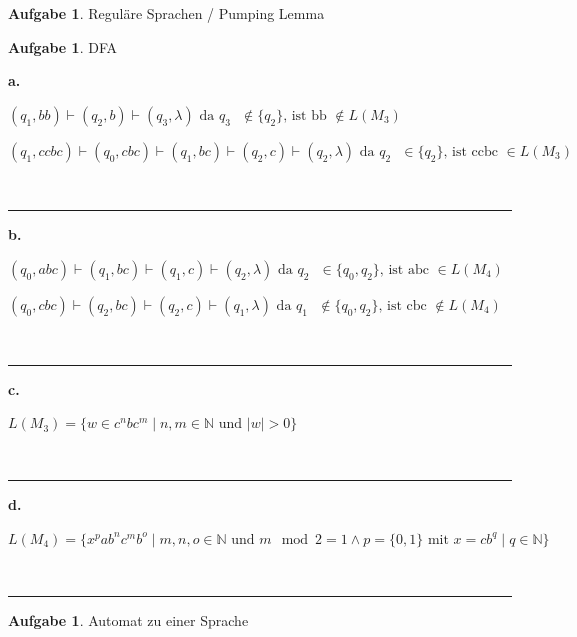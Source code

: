 \documentclass[10pt,leqno ]{article}
\theoremstyle{definition}
\newtheorem{problem}[theorem]{Aufgabe}
\newenvironment{solution}[1][L]{\begin{doublespace}\textbf{#1.}\quad }{\ \rule{0.5em}{0.5em}\end{doublespace}}
\begin{document}
\begin{problem}
    Reguläre Sprachen / Pumping Lemma
\end{problem}

\begin{problem}
    DFA
\end{problem}

\begin{solution}[a]

    \( (q_1,bb) \vdash (q_2,b) \vdash (q_3,\lambda) \text{ da $q_3$ $\notin \{ q_2 \}$, ist bb $\notin L(M_3)$  } \) 

    \( (q_1,ccbc) \vdash (q_0,cbc) \vdash (q_1,bc) \vdash (q_2,c) \vdash (q_2,\lambda) \text{ da $q_2$ $\in \{ q_2 \}$, ist ccbc $\in L(M_3)$  } \)
    
\end{solution}

\begin{solution}[b]
    
    \( (q_0,abc) \vdash (q_1,bc) \vdash (q_1,c) \vdash (q_2,\lambda) \text{ da $q_2$ $\in \{ q_0,q_2 \}$, ist abc $\in L(M_4)$} \)

    \( (q_0,cbc) \vdash (q_2,bc) \vdash (q_2,c) \vdash (q_1,\lambda) \text{ da $q_1$ $\notin \{ q_0,q_2 \}$, ist cbc $\notin L(M_4)$ }\)
    
\end{solution}

\begin{solution}[c]

    \( L(M_3) = \{ w \in c^{n}bc^{m} \mid n,m \in \mathbb{N} \text{ und } |w| > 0 \} \)
    
\end{solution}

\begin{solution}[d]

    \( L(M_4) = \{ x^{p}ab^{n}c^{m}b^{o} \mid m,n,o \in \mathbb{N} \text{ und } m \mod 2 = 1 \land p = \{0,1\}  \text{ mit } x = cb^{q} \mid q \in \mathbb{N} \}\)
    
\end{solution}

\begin{problem}
    Automat zu einer Sprache
\end{problem}
\end{document}
